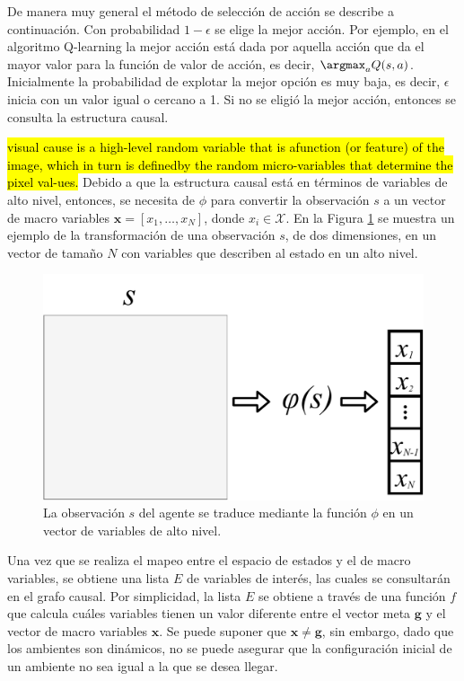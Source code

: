 De manera muy general el método de selección de acción se describe a continuación. 
Con probabilidad $1-\epsilon$ se elige la mejor acción. Por ejemplo, en el algoritmo Q-learning la mejor acción está dada por aquella acción que da el mayor valor para la función de valor de acción, es decir,  $\argmax_a Q(s, a)$.
Inicialmente la probabilidad de
explotar la mejor opción es muy baja, es decir, $\epsilon$ inicia con un valor igual o cercano a 1.
Si no se eligió la mejor acción, entonces se consulta la estructura causal.

  \hl{visual  cause  is  a  high-level  random  variable  that  is  afunction (or feature) of the image, which in turn is definedby the random micro-variables that determine the pixel val-ues.}
Debido a que la estructura causal está en términos de variables de alto nivel,
entonces, se necesita de $\phi$ para  convertir la observación $s$ a un vector de macro variables $\mathbf{x} = [x_1, \dots, x_N]$, donde $x_i \in \mathcal{X}$. En la Figura \ref{fig:obs-to-macro} se muestra un ejemplo de la transformación de una observación $s$, de dos dimensiones, en un vector de tamaño $N$ con variables que describen al estado en un alto nivel.

\begin{figure}[h]
    \centering
    \includegraphics[scale=0.25]{Chapter4/Figs/stox.pdf}
    \caption{La observación $s$ del agente se traduce mediante la función $\phi$ en un vector de variables de alto nivel.}
    \label{fig:obs-to-macro}
\end{figure}

Una vez que se
realiza el mapeo entre el espacio de
estados y el de macro variables, se obtiene una lista  $E$ de variables de interés, las cuales se consultarán en el grafo causal.
Por simplicidad, la lista $E$ se obtiene a través de una función $f$ que calcula cuáles variables tienen un valor diferente entre el vector meta $\mathbf{g}$
y el vector de macro variables $\mathbf{x}$. Se puede suponer que $\mathbf{x} \neq \mathbf{g}$, sin embargo, dado que los ambientes son dinámicos, no se puede asegurar que la configuración inicial de un ambiente no sea igual a la que se desea llegar. 

